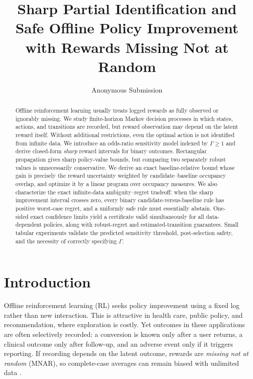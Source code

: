 \documentclass[letterpaper]{article}
\title{Sharp Partial Identification and Safe Offline Policy Improvement\\with Rewards Missing Not at Random}
\author{Anonymous Submission}
\theoremstyle{remark}
\begin{document}
\maketitle

\begin{abstract}
Offline reinforcement learning usually treats logged rewards as fully observed or ignorably missing. We study finite-horizon Markov decision processes in which states, actions, and transitions are recorded, but reward observation may depend on the latent reward itself. Without additional restrictions, even the optimal action is not identified from infinite data. We introduce an odds-ratio sensitivity model indexed by $\Gamma\geq1$ and derive closed-form \emph{sharp} reward intervals for binary outcomes. Rectangular propagation gives sharp policy-value bounds, but comparing two separately robust values is unnecessarily conservative. We derive an exact baseline-relative bound whose gain is precisely the reward uncertainty weighted by candidate--baseline occupancy overlap, and optimize it by a linear program over occupancy measures. We also characterize the exact infinite-data ambiguity--regret tradeoff: when the sharp improvement interval crosses zero, every binary candidate-versus-baseline rule has positive worst-case regret, and a uniformly safe rule must essentially abstain. One-sided exact confidence limits yield a certificate valid simultaneously for all data-dependent policies, along with robust-regret and estimated-transition guarantees. Small tabular experiments validate the predicted sensitivity threshold, post-selection safety, and the necessity of correctly specifying $\Gamma$.
\end{abstract}

\section{Introduction}
Offline reinforcement learning (RL) seeks policy improvement using a fixed log rather than new interaction. This is attractive in health care, public policy, and recommendation, where exploration is costly. Yet outcomes in these applications are often selectively recorded: a conversion is known only after a user returns, a clinical outcome only after follow-up, and an adverse event only if it triggers reporting. If recording depends on the latent outcome, rewards are \emph{missing not at random} (MNAR), so complete-case averages can remain biased with unlimited data \citep{little2019statistical}.
\end{document}
